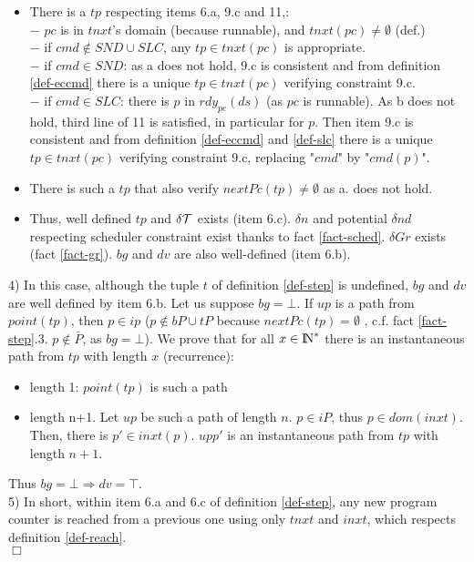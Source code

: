 \documentclass{article}
\newcommand{\NAT}{\mbox{\normalfont I$\!$N}}
\begin{document}
\begin{itemize}
\item There is a $tp$ respecting items 6.a, 9.c and 11,:\\
$-$ $pc$ is in $tnxt$'s domain (because runnable), and $tnxt(pc)\neq\emptyset$ (def.)\\
$-$ if $cmd\notin S\!N\!D\cup S\!LC$, any $tp\in tnxt(pc)$ is appropriate.\\
$-$ if $cmd\in S\!N\!D$: as a does not hold, 9.c is consistent and from definition \ref{def-eccmd} there is a unique $tp\in tnxt(pc)$ verifying constraint 9.c.\\
$-$ if $cmd\in S\!LC$: there is $p$ in $rdy_{pc}(ds)$ (as $pc$ is runnable). As b does not hold, third line of 11 is satisfied, in particular for $p$. Then item 9.c is consistent and from definition \ref{def-eccmd} and \ref{def-slc} there is a unique $tp\in tnxt(pc)$ verifying constraint 9.c, replacing "$cmd$" by "$cmd(p)$".
\item  There is such a $tp$ that also verify $nextPc(tp)\neq\emptyset$ as a. does not hold.
\item Thus, well defined $tp$ and $\delta {\cal T}$ exists (item 6.c). $\delta n$ and potential $\delta nd$ respecting scheduler constraint exist thanks to fact \ref{fact-sched}.  $\delta Gr$ exists (fact \ref{fact-gr}). $bg$ and $dv$ are also well-defined (item 6.b).
\end{itemize}
4) In this case, although the tuple $t$ of definition \ref{def-step} is undefined, $bg$ and $dv$ are well defined by item 6.b. Let us suppose $bg=\bot$. If $up$ is a path from $point(tp)$, then $p\in ip$ ($p\notin bP\cup tP$ because $nextPc(tp)=\emptyset$ , c.f. fact \ref{fact-step}.3. $p\notin \bar P$, as $bg=\bot$). We prove that for all $x\in\NAT^*$ there is an instantaneous path from $tp$ with length $x$ (recurrence):
\begin{itemize}
\item length 1: $point(tp)$ is such a path 
\item length n+1. Let $up$ be such a path of length $n$. $p\in iP$, thus $p\in dom(inxt)$. Then, there is $p'\in inxt(p)$. $upp'$ is an instantaneous path from $tp$ with length $n+1$.
\end{itemize}
Thus $bg=\bot\Rightarrow dv=\top$.\\
5) In short, within item 6.a and 6.c of definition \ref{def-step}, any new program counter is reached from a previous one using only $tnxt$ and $inxt$, which respects definition \ref{def-reach}.
\\
$\Box$
\end{document}
